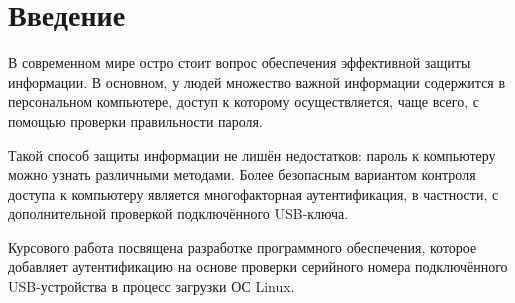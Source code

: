 \chapter*{Введение}

В современном мире остро стоит вопрос обеспечения эффективной защиты информации.
В основном, у людей множество важной информации содержится в персональном компьютере, доступ к которому осуществляется, чаще всего, с помощью проверки правильности пароля.

Такой способ защиты информации не лишён недостатков: пароль к компьютеру можно узнать различными методами.
Более безопасным вариантом контроля доступа к компьютеру является многофакторная аутентификация, в частности, с дополнительной проверкой подключённого USB-ключа.

Курсового работа посвящена разработке программного обеспечения, которое добавляет аутентификацию на основе проверки серийного номера подключённого USB-устройства в процесс загрузки ОС Linux.
